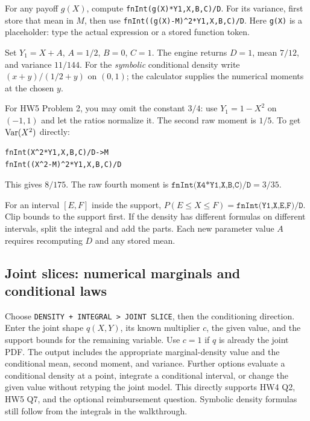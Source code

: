 For any payoff $g(X)$, compute \texttt{fnInt(g(X)*Y1,X,B,C)/D}. For its variance, first store that mean in $M$, then use \texttt{fnInt((g(X)-M)\^{}2*Y1,X,B,C)/D}. Here \texttt{g(X)} is a placeholder: type the actual expression or a stored function token.

\begin{example}
Set $Y_1=X+A$, $A=1/2$, $B=0$, $C=1$. The engine returns $D=1$, mean $7/12$, and variance $11/144$. For the \emph{symbolic} conditional density write $(x+y)/(1/2+y)$ on $(0,1)$; the calculator supplies the numerical moments at the chosen $y$.
\end{example}

For HW5 Problem 2, you may omit the constant $3/4$: use $Y_1=1-X^2$ on $(-1,1)$ and let the ratios normalize it. The second raw moment is $1/5$. To get $\operatorname{Var}(X^2)$ directly:
\begin{verbatim}
fnInt(X^2*Y1,X,B,C)/D->M
fnInt((X^2-M)^2*Y1,X,B,C)/D
\end{verbatim}
This gives $8/175$. The raw fourth moment is $\texttt{fnInt(X\^{}4*Y1,X,B,C)/D}=3/35$.

For an interval $[E,F]$ inside the support, $P(E\le X\le F)=\texttt{fnInt(Y1,X,E,F)/D}$. Clip bounds to the support first. If the density has different formulas on different intervals, split the integral and add the parts. Each new parameter value $A$ requires recomputing $D$ and any stored mean.

\subsection{Joint slices: numerical marginals and conditional laws}
Choose \texttt{DENSITY + INTEGRAL > JOINT SLICE}, then the conditioning direction. Enter the joint shape $q(X,Y)$, its known multiplier $c$, the given value, and the support bounds for the remaining variable. Use $c=1$ if $q$ is already the joint PDF. The output includes the appropriate marginal-density value and the conditional mean, second moment, and variance. Further options evaluate a conditional density at a point, integrate a conditional interval, or change the given value without retyping the joint model. This directly supports HW4 Q2, HW5 Q7, and the optional reimbursement question. Symbolic density formulas still follow from the integrals in the walkthrough.

